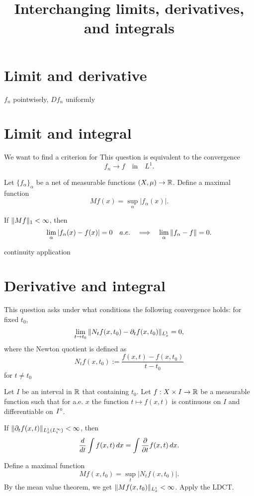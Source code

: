 \documentclass{../exp}
\title{Interchanging limits, derivatives, and integrals}
\begin{document}
\section{Limit and derivative}

$f_n$ pointwisely, $Df_n$ uniformly








\section{Limit and integral}
We want to find a criterion for 
This question is equivalent to the convergence
\[f_n\to f\quad\text{in}\quad L^1.\]

\begin{thm}
Let $\{f_\alpha\}_\alpha$ be a net of measurable functions $(X,\mu)\to\R$.
Define a maximal function
\[Mf(x)=\sup_\alpha|f_\alpha(x)|.\]

If $\|Mf\|_1<\infty$, then
\[\lim_\alpha|f_\alpha(x)-f(x)|=0\quad a.e.\impl\lim_\alpha\|f_\alpha-f\|=0.\]
\end{thm}

continuity application








\section{Derivative and integral}
This question asks under what conditions the following convergence holds: for fixed $t_0$,
\[\lim_{t\to t_0}\|N_tf(x,t_0)-\pd_tf(x,t_0)\|_{L_x^1}=0,\]
where the Newton quotient is defined as
\[N_tf(x,t_0):=\frac{f(x,t)-f(x,t_0)}{t-t_0}\]
for $t\ne t_0$

\begin{thm}
Let $I$ be an interval in $\mathbb{R}$ that containing $t_0$.
Let $f:X\x I\to\R$ be a measurable function such that for a.e. $x$ the function $t\mapsto f(x,t)$ is continuous on $I$ and differentiable on $I^\circ$.

If $\|\pd_tf(x,t)\|_{L_x^1(L_t^\oo)}<\oo$, then
\[\dd{t}\int f(x,t)\,dx=\int\pd{t}f(x,t)\,dx.\]
\end{thm}
\begin{pf}
Define a maximal function
\[Mf(x,t_0)=\sup_t|N_tf(x,t_0)|.\]
By the mean value theorem, we get $\|Mf(x,t_0)\|_{L_x^1}<\infty$.
Apply the LDCT.
\end{pf}
\end{document}
